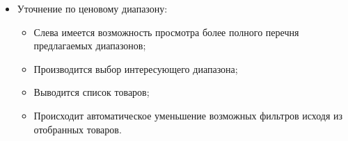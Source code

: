 {\begin{itogolong}
\begin{itemize}
\item Уточнение по ценовому диапазону:

	\begin{itemize}
		\item Слева имеется возможность просмотра более полного перечня предлагаемых диапазонов;
		\item Производится выбор интересующего диапазона;
		\item Выводится список товаров;
		\item Происходит автоматическое уменьшение возможных фильтров исходя из отобранных товаров.
	\end{itemize}

\end{itemize}
\end{itogolong}
}



